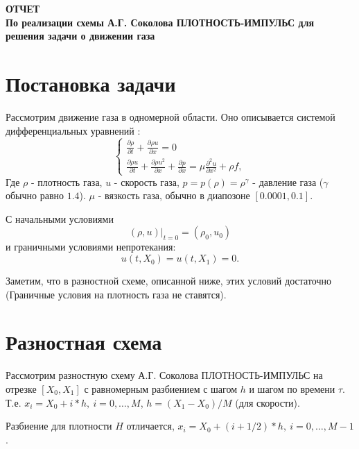 \documentclass[12pt]{article}
\begin{document}
\begin{center}
\Large\bf ОТЧЕТ \\
По реализации схемы А.Г. Соколова 
ПЛОТНОСТЬ-ИМПУЛЬС для решения задачи о движении газа

\end{center}
\section{Постановка задачи}

Рассмотрим движение газа в одномерной области.
Оно описывается системой дифференциальных уравнений :
\begin{equation}
\label{eq:1}
\begin{cases}
\frac {\partial \rho} {\partial t} + \frac{\partial \rho u} {\partial x} = 0 
\\
\frac {\partial \rho u} {\partial t} + \frac {\partial \rho u^2} {\partial x} + \frac {\partial p} {\partial x} = \mu \frac {\partial^2 u} {\partial x^2} + \rho f,
\end{cases}
\end{equation}
Где $\rho$ - плотность газа, $u$ - скорость газа, $p = p(\rho) = \rho ^ \gamma$ - давление газа ($\gamma$ обычно равно $1.4$).
$\mu$ - вязкость газа, обычно в диапозоне $[0.0001, 0.1]$.

С начальными условиями
\begin{equation}
(\rho, u)|_{t = 0} = (\rho_0, u_0)
\end{equation}
и граничными условиями непротекания:
\begin{equation}
u(t,X_0) = u(t,X_1) = 0.
\end{equation}

Заметим, что в разностной схеме, описанной ниже, этих условий достаточно (Граничные условия на плотность газа не ставятся).

\section {Разностная схема}

Рассмотрим разностную схему А.Г. Соколова ПЛОТНОСТЬ-ИМПУЛЬС на отрезке $[X_0, X_1]$ с равномерным разбиением с шагом $h$ и шагом по времени $\tau$.
Т.е. $x_i = X_0 + i * h, \ i = 0,\ldots, M$, $h = (X_1 - X_0) / M$ (для скорости).

Разбиение для плотности $H$ отличается, $x_i = X_0 + (i + 1/2) * h,\ i = 0,\ldots,M-1 $.
\end{document}
